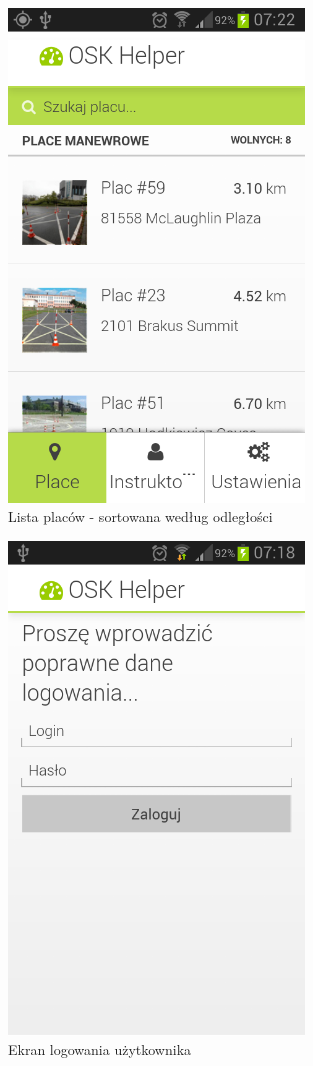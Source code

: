 \documentclass[twoside,a4paper,openright,12pt]{book}
\begin{document}
\begin{figure}[htbp]
\centering
\includegraphics[width=0.7\textwidth]{screenshots/android/lista_placow.png}
\caption{Lista placów - sortowana według odległości}
\end{figure}

\begin{figure}[htbp]
\centering
\includegraphics[width=0.7\textwidth]{screenshots/android/logowanie.png}
\caption{Ekran logowania użytkownika}
\end{figure}
\end{document}

